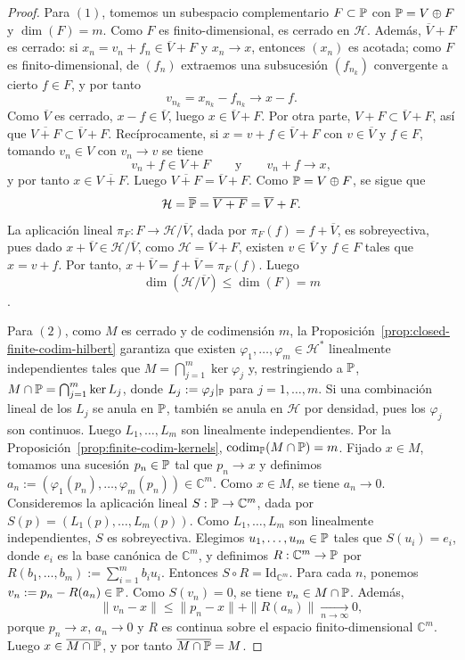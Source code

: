 \begin{proof}
	Para $(1)$, tomemos un subespacio complementario $F\subset\mathbb{P}$ con $\mathbb{P}=V\oplus F$ y $\dim(F)=m$.
	Como $F$ es finito-dimensional, es cerrado en $\mathcal H$. Además, $\overline V+F$ es cerrado: si $x_n=v_n+f_n\in \overline V+F$ y $x_n\to x$, entonces $(x_n)$ es acotada; como $F$ es finito-dimensional, de $(f_n)$ extraemos una subsucesión $(f_{n_k})$ convergente a cierto $f\in F$, y por tanto $$v_{n_k}=x_{n_k}-f_{n_k}\to x-f.$$
	Como $\overline V$ es cerrado, $x-f\in\overline V$, luego $x\in\overline V+F$. Por otra parte, \(V+F\subset \overline V+F\), así que \(\overline{V+F}\subset \overline V+F\).
	Recíprocamente, si $x=v+f\in \overline V+F$ con $v\in\overline V$ y $f\in F$, tomando $v_n\in V$ con $v_n\to v$ se tiene $$v_n+f\in V+F \qquad \text{y} \qquad v_n+f\to x,$$
	y por tanto $x\in\overline{V+F}$. Luego \(\overline{V+F}=\overline V+F\).
	Como $\mathbb{P}=V\oplus F$, se sigue que
	\[
		\mathcal H=\overline{\mathbb{P}}=\overline{V+F}=\overline V+F.
	\]
	La aplicación lineal $\pi_F:F\to \mathcal H/\overline V$, dada por $\pi_F(f)=f+\overline V$, es sobreyectiva, pues dado $x+\overline V\in \mathcal H/\overline V$, como \(\mathcal H=\overline V+F\), existen $v\in \overline V$ y $f\in F$ tales que $x=v+f$. Por tanto, \(x+\overline V=f+\overline V=\pi_F(f)\). Luego \[\dim(\mathcal H/\overline V)\le \dim(F)=m\].

	Para $(2)$, como $M$ es cerrado y de codimensión $m$, la Proposición~\ref{prop:closed-finite-codim-hilbert} garantiza que existen $\varphi_1,\dots,\varphi_m\in\mathcal H^*$ linealmente independientes tales que $M=\bigcap_{j=1}^m \ker \varphi_j$ y, restringiendo a $\mathbb{P}$, $M\cap\mathbb{P}=\bigcap_{j=1}^m \ker L_j$,
	donde $L_j:=\varphi_j|_{\mathbb{P}}$ para $j=1,\dots,m$. Si una combinación lineal de los $L_j$ se anula en $\mathbb{P}$, también se anula en $\mathcal H$ por densidad, pues los $\varphi_j$ son continuos. Luego $L_1,\dots,L_m$ son linealmente independientes. Por la Proposición~\ref{prop:finite-codim-kernels}, \(\operatorname{codim}_{\mathbb{P}}(M\cap\mathbb{P})=m\).
	Fijado $x\in M$, tomamos una sucesión $p_n\in\mathbb{P}$ tal que $p_n\to x$ y definimos \(a_n:=(\varphi_1(p_n),\dots,\varphi_m(p_n))\in\mathbb C^m\).
	Como $x\in M$, se tiene $a_n\to 0$. Consideremos la aplicación lineal $S:\mathbb{P}\to\mathbb C^m$, dada por $S(p)=(L_1(p),\dots,L_m(p))$.
	Como $L_1,\dots,L_m$ son linealmente independientes, $S$ es sobreyectiva. Elegimos $u_1,\dots,u_m\in\mathbb{P}$ tales que $S(u_i)=e_i$, donde $e_i$ es la base canónica de $\mathbb C^m$, y definimos $R:\mathbb C^m\to\mathbb{P}$ por $R(b_1,\dots,b_m):=\sum_{i=1}^m b_i u_i$.
	Entonces $S\circ R=\mathrm{Id}_{\mathbb C^m}$. Para cada $n$, ponemos \(v_n:=p_n-R(a_n)\in\mathbb{P}\).
	Como $S(v_n)=0$, se tiene $v_n\in M\cap\mathbb{P}$. Además, $$\|v_n-x\|\le \|p_n-x\|+\|R(a_n)\|\xrightarrow[n\to\infty]{}0,$$
	porque $p_n\to x$, $a_n\to0$ y $R$ es continua sobre el espacio finito-dimensional $\mathbb C^m$. Luego $x\in\overline{M\cap\mathbb{P}}$, y por tanto $\overline{M\cap\mathbb{P}}=M$.
\end{proof}

